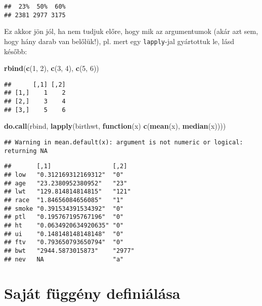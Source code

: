 \documentclass[
]{book}
\newenvironment{Shaded}{\begin{snugshade}}{\end{snugshade}}
\newcommand{\ControlFlowTok}[1]{\textcolor[rgb]{0.13,0.29,0.53}{\textbf{#1}}}
\newcommand{\DecValTok}[1]{\textcolor[rgb]{0.00,0.00,0.81}{#1}}
\newcommand{\KeywordTok}[1]{\textcolor[rgb]{0.13,0.29,0.53}{\textbf{#1}}}
\newcommand{\NormalTok}[1]{#1}
\begin{document}
\begin{verbatim}
##  23%  50%  60% 
## 2381 2977 3175
\end{verbatim}

Ez akkor jön jól, ha nem tudjuk előre, hogy mik az argumentumok (akár azt sem, hogy hány darab van belőlük!), pl. mert egy \texttt{lapply}-jal gyártottuk le, lásd később:

\begin{Shaded}
\begin{Highlighting}[]
\KeywordTok{rbind}\NormalTok{(}\KeywordTok{c}\NormalTok{(}\DecValTok{1}\NormalTok{, }\DecValTok{2}\NormalTok{), }\KeywordTok{c}\NormalTok{(}\DecValTok{3}\NormalTok{, }\DecValTok{4}\NormalTok{), }\KeywordTok{c}\NormalTok{(}\DecValTok{5}\NormalTok{, }\DecValTok{6}\NormalTok{))}
\end{Highlighting}
\end{Shaded}

\begin{verbatim}
##      [,1] [,2]
## [1,]    1    2
## [2,]    3    4
## [3,]    5    6
\end{verbatim}

\begin{Shaded}
\begin{Highlighting}[]
\KeywordTok{do.call}\NormalTok{(rbind, }\KeywordTok{lapply}\NormalTok{(birthwt, }\ControlFlowTok{function}\NormalTok{(x) }\KeywordTok{c}\NormalTok{(}\KeywordTok{mean}\NormalTok{(x), }\KeywordTok{median}\NormalTok{(x))))}
\end{Highlighting}
\end{Shaded}

\begin{verbatim}
## Warning in mean.default(x): argument is not numeric or logical: returning NA
\end{verbatim}

\begin{verbatim}
##       [,1]                 [,2]  
## low   "0.312169312169312"  "0"   
## age   "23.2380952380952"   "23"  
## lwt   "129.814814814815"   "121" 
## race  "1.84656084656085"   "1"   
## smoke "0.391534391534392"  "0"   
## ptl   "0.195767195767196"  "0"   
## ht    "0.0634920634920635" "0"   
## ui    "0.148148148148148"  "0"   
## ftv   "0.793650793650794"  "0"   
## bwt   "2944.5873015873"    "2977"
## nev   NA                   "a"
\end{verbatim}

\hypertarget{sajuxe1t-fuxfcgguxe9ny-definiuxe1luxe1sa}{%
\section{Saját függény definiálása}\label{sajuxe1t-fuxfcgguxe9ny-definiuxe1luxe1sa}}
\end{document}
